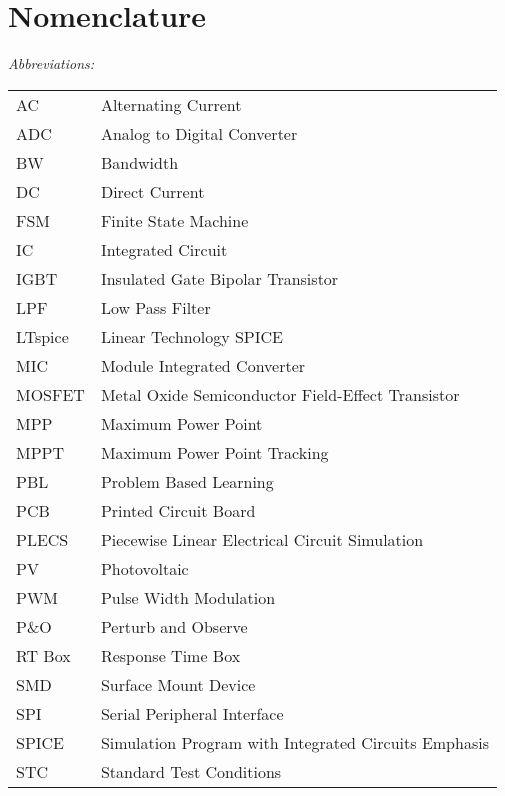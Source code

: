 \chapter*{Nomenclature}

 

\vspace{-10mm} %
\textit{Abbreviations:}\newline
\begin{tabular}{ll} %
AC & Alternating Current\\
ADC & Analog to Digital Converter \\
BW & Bandwidth \\
DC & Direct Current\\
FSM & Finite State Machine \\
IC & Integrated Circuit\\
IGBT & Insulated Gate Bipolar Transistor \\
LPF & Low Pass Filter\\
LTspice & Linear Technology SPICE \\
MIC & Module Integrated Converter\\
MOSFET & Metal Oxide Semiconductor Field-Effect Transistor\\
MPP & Maximum Power Point\\
MPPT & Maximum Power Point Tracking\\
PBL & Problem Based Learning\\
PCB & Printed Circuit Board\\
PLECS & Piecewise Linear Electrical Circuit Simulation\\
PV & Photovoltaic\\
PWM & Pulse Width Modulation\\
P\&O & Perturb and Observe\\
RT Box & Response Time Box \\
SMD & Surface Mount Device \\
SPI & Serial Peripheral Interface\\
SPICE & Simulation Program with Integrated Circuits Emphasis \\
STC & Standard Test Conditions\\
\end{tabular}

